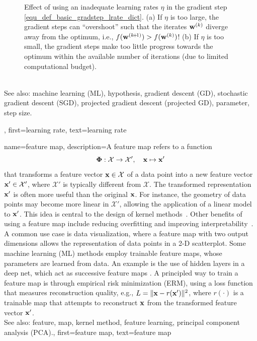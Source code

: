 {{{\begin{figure}[hbtp]
\begin{center}
\begin{minipage}{0.45\columnwidth}
			\end{minipage}
		\end{center}
		\caption{Effect of using an inadequate learning rates $\eta$ in the gradient step 
		         \eqref{equ_def_basic_gradstep_lrate_dict}. (a) If $\eta$ is too large, 
				 the gradient steps can ``overshoot'' such that the iterates ${\bf w}^{(k)}$ 
				 diverge away from the optimum, i.e., $f({\bf w}^{(k\!+\!1)}) > f({\bf w}^{(k)})$! 
		(b) If $\eta$ is too small, the gradient steps make too little progress towards 
		the optimum within the available number of iterations (due to limited computational budget). 
		\label{fig_small_large_lrate_dict}}
		\end{figure}
				\\
		See also: machine learning (ML), hypothesis, gradient descent (GD), stochastic gradient descent (SGD), projected gradient descent (projected GD), parameter, step size.},
	first={learning rate},
	text={learning rate} 
}

{name={feature map}, 
	description={A feature map refers to a function 
		$$
		{\bf \Phi}: \mathcal{X} \rightarrow \mathcal{X}', \quad {\bf x} \mapsto {\bf x}'
		$$
		that transforms a feature vector ${\bf x} \in \mathcal{X}$ of 
 		a data point into a new feature vector ${\bf x}' \in \mathcal{X}'$, 
 		where $\mathcal{X}'$ is typically different from $\mathcal{X}$.
 		The transformed representation ${\bf x}'$ is often more useful than the original 
 		${\bf x}$. For instance, the geometry of data points may become more linear 
 		in $\mathcal{X}'$, allowing the application of a linear model to ${\bf x}'$. 
 		This idea is central to the design of kernel methods~\cite{LearningKernelsBook}.
 		Other benefits of using a feature map include reducing overfitting and 
 		improving interpretability~\cite{Ribeiro2016}. A common use case is data 
 		visualization, where a feature map with two output dimensions allows the representation 
 		of data points in a 2-D scatterplot. Some machine learning (ML) methods employ trainable 
 		feature maps, whose parameters are learned from data. An example is 
 		the use of hidden layers in a deep net, which act as successive feature maps 
 		\cite{MallatUnderstandingDeepLearning}. A principled way to train a feature map 
 		is through empirical risk minimization (ERM), using a loss function that measures reconstruction quality, 
 		e.g., $L = \|{\bf x} - r({\bf x}')\|^2$, where $r(\cdot)$ is a trainable
 		map that attempts to reconstruct ${\bf x}$ from the transformed feature vector ${\bf x}'$.
				\\
		See also: feature, map, kernel method, feature learning, principal component analysis (PCA).},
	first={feature map},
	text={feature map} 
}
	
}
